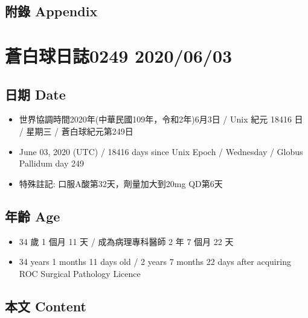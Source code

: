\documentclass[
]{article}
\providecommand{\tightlist}{%
  \setlength{\itemsep}{0pt}\setlength{\parskip}{0pt}}
\begin{document}
\hypertarget{ux9644ux9304-appendix-1}{%
\subsection{附錄 Appendix}\label{ux9644ux9304-appendix-1}}

\hypertarget{ux84bcux767dux7403ux65e5ux8a8c0249-20200603}{%
\section{蒼白球日誌0249
2020/06/03}\label{ux84bcux767dux7403ux65e5ux8a8c0249-20200603}}

\hypertarget{ux65e5ux671f-date-2}{%
\subsection{日期 Date}\label{ux65e5ux671f-date-2}}

\begin{itemize}
\tightlist
\item
  世界協調時間2020年(中華民國109年，令和2年)6月3日 / Unix 紀元 18416 日
  / 星期三 / 蒼白球紀元第249日
\item
  June 03, 2020 (UTC) / 18416 days since Unix Epoch / Wednesday / Globus
  Pallidum day 249
\item
  特殊註記: 口服A酸第32天，劑量加大到20mg QD第6天
\end{itemize}

\hypertarget{ux5e74ux9f61-age-2}{%
\subsection{年齡 Age}\label{ux5e74ux9f61-age-2}}

\begin{itemize}
\tightlist
\item
  34 歲 1 個月 11 天 / 成為病理專科醫師 2 年 7 個月 22 天
\item
  34 years 1 months 11 days old / 2 years 7 months 22 days after
  acquiring ROC Surgical Pathology Licence
\end{itemize}

\hypertarget{ux672cux6587-content-2}{%
\subsection{本文 Content}\label{ux672cux6587-content-2}}
\end{document}
